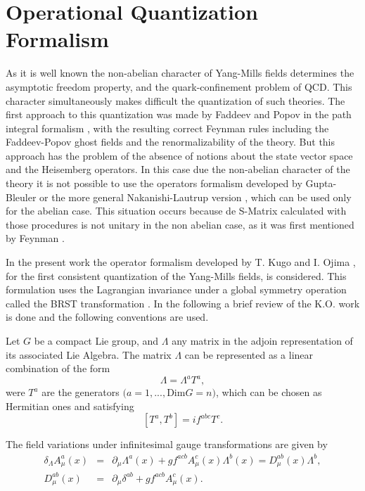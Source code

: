 \documentclass[12pt,letterpaper]{report}
\begin{document}
\section{Operational Quantization Formalism}

As it is well known the non-abelian character of Yang-Mills fields
determines the asymptotic freedom property, and the
quark-confinement problem of QCD. This character simultaneously
makes difficult the quantization of such theories. The first
approach to this quantization was made by Faddeev and Popov in the
path integral formalism \cite{Faddeev-Popov}, with the resulting
correct Feynman rules including the Faddeev-Popov ghost fields and
the renormalizability of the theory. But this approach has the
problem of the absence of notions about the state vector space and
the Heisemberg operators. In this case due the non-abelian
character of the theory it is not possible to use the operators
formalism developed by Gupta-Bleuler \cite{Gupta} or the more
general Nakanishi-Lautrup version \cite{Nakanishi}, which can be
used only for the abelian case. This situation occurs because de
S-Matrix calculated with those procedures is not unitary in the
non abelian case, as it was first mentioned by Feynman
\cite{Feynman}.

In the present work the operator formalism developed by T. Kugo
and I. Ojima \cite{Kugo}, for the first consistent quantization of
the Yang-Mills fields, is considered. This formulation uses the
Lagrangian invariance under a global symmetry operation called the
BRST transformation \cite{BRST}. In the following a brief review
of the K.O. work is done and the following conventions are used.

Let $G$ be a compact Lie group, and $\Lambda$ any matrix in the
adjoin representation of its associated Lie Algebra. The matrix
$\Lambda$ can be represented as a linear combination of the form
\[
\Lambda =\Lambda ^aT^a,
\]
were $T^a$ are the generators $(a=1,...,$Dim$G=n)$, which can be
chosen as Hermitian ones and satisfying
\[
\left[ T^a,T^b\right] =if^{abc}T^c.
\]

The field variations under infinitesimal gauge transformations are
given by
\begin{eqnarray*}
\delta _\Lambda A_\mu ^a\left(x\right) &=&\partial _\mu \Lambda
^a\left(x\right) +gf^{acb}A_\mu ^c\left(x\right) \Lambda ^b\left(
x\right) =D_\mu ^{ab}\left(x\right) \Lambda ^b, \\ D_\mu
^{ab}\left(x\right) &=&\partial _\mu \delta ^{ab}+gf^{acb}A_\mu
^c\left(x\right).
\end{eqnarray*}
\end{document}
